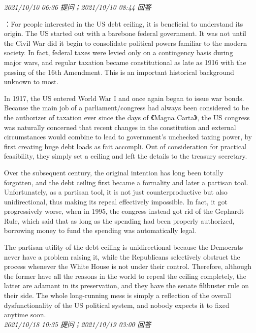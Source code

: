 \documentclass[twocolumn]{ctexart}
\begin{document}
\textit{\hfill\noindent\small 2021/10/10 06:36 提问；2021/10/10 08:44 回答}

：For people interested in the US debt ceiling, it is beneficial to understand its origin. The US started out with a barebone federal government. It was not until the Civil War did it begin to consolidate political powers familiar to the modern society. In fact, federal taxes were levied only on a contingency basis during major wars, and regular taxation became constitutional as late as 1916 with the passing of the 16th Amendment. This is an important historical background unknown to most.

In 1917, the US entered World War I and once again began to issue war bonds. Because the main job of a parliament/congress had always been considered to be the authorizer of taxation ever since the days of 《Magna Carta》, the US congress was naturally concerned that recent changes in the constitution and external circumstances would combine to lead to government's unchecked taxing power, by first creating huge debt loads as fait accompli. Out of consideration for practical feasibility, they simply set a ceiling and left the details to the treasury secretary.

Over the subsequent century, the original intention has long been totally forgotten, and the debt ceiling first became a formality and later a partisan tool. Unfortunately, as a partisan tool, it is not just counterproductive but also unidirectional, thus making its repeal effectively impossible. In fact, it got progressively worse, when in 1995, the congress instead got rid of the Gephardt Rule, which said that as long as the spending had been properly authorized, borrowing money to fund the spending was automatically legal.

The partisan utility of the debt ceiling is unidirectional because the Democrats never have a problem raising it, while the Republicans selectively obstruct the process whenever the White House is not under their control. Therefore, although the former have all the reasons in the world to repeal the ceiling completely, the latter are adamant in its preservation, and they have the senate filibuster rule on their side. The whole long-running mess is simply a reflection of the overall dysfunctionality of the US political system, and nobody expects it to fixed anytime soon.
\\

\textit{\hfill\noindent\small 2021/10/18 10:35 提问；2021/10/19 03:00 回答}
\end{document}
